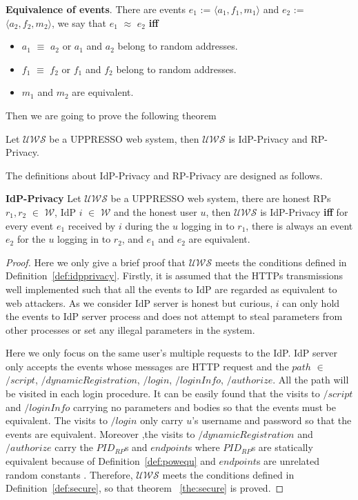 \begin{definition}
\vspace{1mm}\noindent\textbf{Equivalence of events}. 
There are events $e_1$ := $\langle a_1, f_1, m_1 \rangle$ and $e_2$ := $\langle a_2, f_2, m_2 \rangle$, we say that $e_1$ $\approx$ $e_2$ \textbf{iff} 
\begin{itemize}
\item $a_1$ $\equiv$ $a_2$ or $a_1$ and $a_2$ belong to random addresses.
\item $f_1$ $\equiv$ $f_2$ or $f_1$ and $f_2$ belong to random addresses.
\item $m_1$ and $m_2$ are equivalent.
\end{itemize}
\label{def:eventequ}
\end{definition}

Then we are going to prove the following theorem
\begin{theorem}
Let  $\mathcal{UWS}$ be a UPPRESSO web system, then $\mathcal{UWS}$ is IdP-Privacy and RP-Privacy. 
\label{the:privacy}
\end{theorem}
The definitions about IdP-Privacy and RP-Privacy are designed as follows.
\begin{definition}
\vspace{1mm}\noindent\textbf{IdP-Privacy} Let  $\mathcal{UWS}$ be a UPPRESSO web system, there are honest RPs $r_1, r_2$ $\in$ $\mathcal{W}$, IdP $i$ $\in$ $\mathcal{W}$ and the honest user $u$, then $\mathcal{UWS}$ is IdP-Privacy \textbf{iff} for every event $e_1$ received by $i$ during the $u$ logging in to $r_1$, there is always an event $e_2$ for the $u$ logging in to $r_2$, and $e_1$ and $e_2$ are equivalent.
\label{def:idpprivacy}
\end{definition}
\begin{proof}
Here we only give a brief proof that $\mathcal{UWS}$ meets the conditions defined in Definition~\ref{def:idpprivacy}. 
Firstly, it is assumed that the HTTPs transmissions well implemented  such that all the events to IdP are regarded as equivalent to web attackers.
As we consider IdP server is honest but curious, $i$ can only hold the events to IdP server process and does not attempt to steal parameters from other processes or set any illegal parameters in the system. 

Here we only focus on the same user's multiple requests to the IdP.  IdP server only accepts the events whose messages are HTTP request and the $path$ $\in$ {$/script$, $/dynamicRegistration$, $/login$, $/loginInfo$, $/authorize$}.
All the path will be visited in each login procedure. It can be easily found that the visits to $/script$ and $/loginInfo$ carrying no parameters and bodies so that the events must be equivalent. The visits to $/login$ only carry $u$'s username and password so that the events are equivalent. Moreover ,the visits to $/dynamicRegistration$ and $/authorize$ carry the $PID_{RP}$s and $endpoint$s where $PID_{RP}$s are statically equivalent because of Definition~\ref{def:powequ} and $endpoint$s are unrelated random constants . Therefore, $\mathcal{UWS}$ meets the conditions defined in Definition~\ref{def:secure}, so that theorem ~\ref{the:secure} is proved. 
\end{proof}


